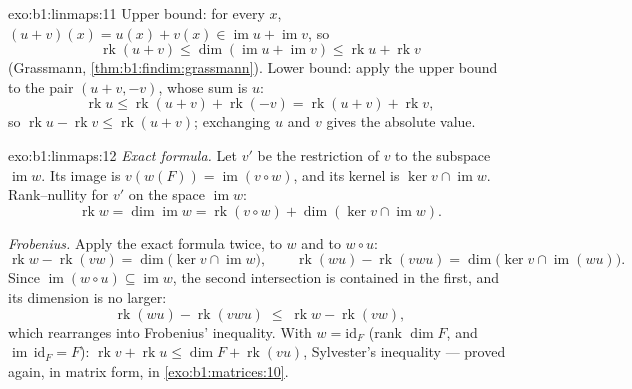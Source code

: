 \begin{solution}{exo:b1:linmaps:11}
Upper bound: for every $x$, $(u + v)(x) = u(x) + v(x) \in
\operatorname{im} u + \operatorname{im} v$, so
\[
\operatorname{rk}(u + v)
\leq \dim(\operatorname{im} u + \operatorname{im} v)
\leq \operatorname{rk} u + \operatorname{rk} v
\]
(Grassmann, \cref{thm:b1:findim:grassmann}). Lower bound: apply
the upper bound to the pair $(u + v, -v)$, whose sum is $u$:
\[
\operatorname{rk} u \leq \operatorname{rk}(u + v) +
\operatorname{rk}(-v) = \operatorname{rk}(u + v) +
\operatorname{rk} v,
\]
so $\operatorname{rk} u - \operatorname{rk} v \leq
\operatorname{rk}(u+v)$; exchanging $u$ and $v$ gives the absolute
value.
\end{solution}

\begin{solution}{exo:b1:linmaps:12}
\emph{Exact formula.} Let $v'$ be the restriction of $v$ to the
subspace $\operatorname{im} w$. Its image is $v(w(F)) =
\operatorname{im}(v \circ w)$, and its kernel is $\ker v \cap
\operatorname{im} w$. Rank--nullity for $v'$ on the space
$\operatorname{im} w$:
\[
\operatorname{rk} w = \dim\operatorname{im} w
= \operatorname{rk}(v \circ w) + \dim(\ker v \cap
\operatorname{im} w) .
\]

\emph{Frobenius.} Apply the exact formula twice, to $w$ and to
$w \circ u$:
\[
\operatorname{rk} w - \operatorname{rk}(vw)
= \dim\bigl(\ker v \cap \operatorname{im} w\bigr),
\qquad
\operatorname{rk}(wu) - \operatorname{rk}(vwu)
= \dim\bigl(\ker v \cap \operatorname{im}(wu)\bigr) .
\]
Since $\operatorname{im}(w \circ u) \subseteq \operatorname{im}
w$, the second intersection is contained in the first, and its
dimension is no larger:
\[
\operatorname{rk}(wu) - \operatorname{rk}(vwu)
\;\leq\; \operatorname{rk} w - \operatorname{rk}(vw) ,
\]
which rearranges into Frobenius' inequality. With $w =
\mathrm{id}_F$ (rank $\dim F$, and $\operatorname{im}\,
\mathrm{id}_F = F$): $\operatorname{rk} v + \operatorname{rk} u
\leq \dim F + \operatorname{rk}(vu)$, Sylvester's inequality ---
proved again, in matrix form, in \cref{exo:b1:matrices:10}.
\end{solution}

